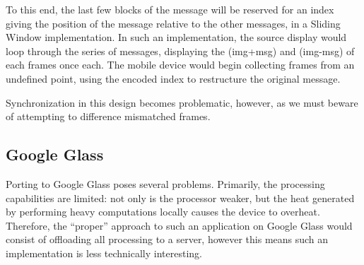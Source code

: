 \documentclass[11pt, letterpaper]{article}
\begin{document}
To this end, the last few blocks of the message will be reserved for an index giving the position of the message relative to the other messages, in a Sliding Window implementation.
In such an implementation, the source display would loop through the series of messages, displaying the (img+msg) and (img-msg) of each frames once each.
The mobile device would begin collecting frames from an undefined point, using the encoded index to restructure the original message.

Synchronization in this design becomes problematic, however, as we must beware of attempting to difference mismatched frames.

\subsection{Google Glass}
Porting to Google Glass poses several problems. Primarily, the processing capabilities are limited: not only is the processor weaker, but the heat generated by performing heavy computations locally causes the device to overheat.
Therefore, the ``proper'' approach to such an application on Google Glass would consist of offloading all processing to a server, however this means such an implementation is less technically interesting.

\printbibliography
\end{document}
